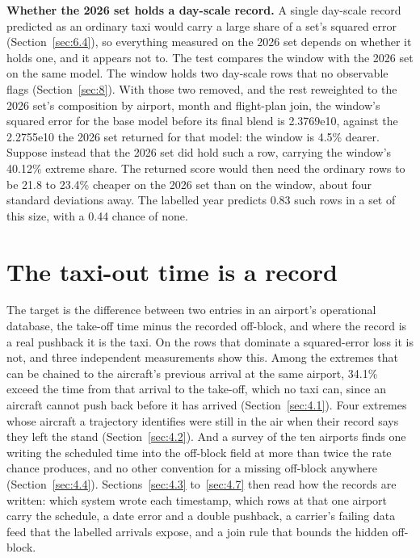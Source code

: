 \documentclass[
  manuscript=article,
  layout=preprint,
  year=2026,
  volume=x,
]{extra/joas}
\begin{document}
\textbf{Whether the 2026 set holds a day-scale record.} A single day-scale record predicted as an ordinary taxi would carry a large share of a set's squared error (Section~\ref{sec:6.4}), so everything measured on the 2026 set depends on whether it holds one, and it appears not to. The test compares the window with the 2026 set on the same model. The window holds two day-scale rows that no observable flags (Section~\ref{sec:8}). With those two removed, and the rest reweighted to the 2026 set's composition by airport, month and flight-plan join, the window's squared error for the base model before its final blend is 2.3769e10, against the 2.2755e10 the 2026 set returned for that model: the window is 4.5\% dearer. Suppose instead that the 2026 set did hold such a row, carrying the window's 40.12\% extreme share. The returned score would then need the ordinary rows to be 21.8 to 23.4\% cheaper on the 2026 set than on the window, about four standard deviations away. The labelled year predicts 0.83 such rows in a set of this size, with a 0.44 chance of none.

\section{The taxi-out time is a record}\label{sec:4}

The target is the difference between two entries in an airport's operational database, the take-off time minus the recorded off-block, and where the record is a real pushback it is the taxi. On the rows that dominate a squared-error loss it is not, and three independent measurements show this. Among the extremes that can be chained to the aircraft's previous arrival at the same airport, 34.1\% exceed the time from that arrival to the take-off, which no taxi can, since an aircraft cannot push back before it has arrived (Section~\ref{sec:4.1}). Four extremes whose aircraft a trajectory identifies were still in the air when their record says they left the stand (Section~\ref{sec:4.2}). And a survey of the ten airports finds one writing the scheduled time into the off-block field at more than twice the rate chance produces, and no other convention for a missing off-block anywhere (Section~\ref{sec:4.4}). Sections~\ref{sec:4.3} to~\ref{sec:4.7} then read how the records are written: which system wrote each timestamp, which rows at that one airport carry the schedule, a date error and a double pushback, a carrier's failing data feed that the labelled arrivals expose, and a join rule that bounds the hidden off-block.
\end{document}
